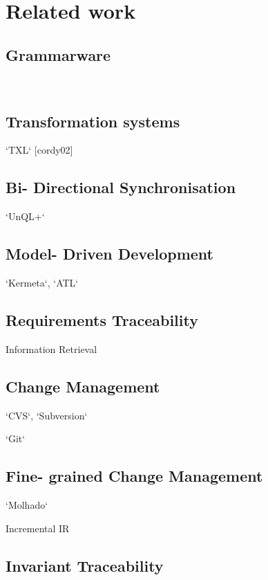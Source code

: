 \documentclass[10pt, conference, compsocconf]{IEEEtran}
\begin{document}
\section{Related work}
\subsection{Grammarware}
 
   ~\cite{klint05tosem}
   
\subsection{Transformation systems}

   `TXL` [cordy02]
   
\subsection{Bi- Directional Synchronisation}

   `UnQL+`
   
\subsection{Model- Driven Development}

   `Kermeta`, `ATL`
   
\subsection{Requirements Traceability}

   Information Retrieval
   
\subsection{Change Management}

   `CVS`, `Subversion`
   
   `Git`
   
\subsection{Fine- grained Change Management}

   `Molhado`
   
   Incremental IR
   
\subsection{Invariant Traceability}
\end{document}

